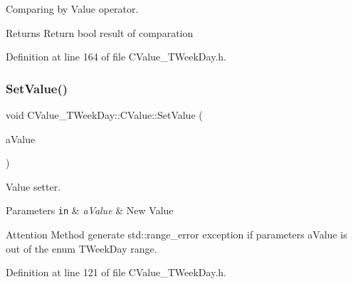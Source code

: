 Comparing by Value operator. 

\begin{DoxyReturn}{Returns}
Return {\ttfamily bool} result of comparation 
\end{DoxyReturn}


Definition at line 164 of file C\+Value\+\_\+\+T\+Week\+Day.\+h.

\mbox{\label{class_c_value___t_week_day_1_1_c_value_a3b2ee2ee229058d33770ec4787eed8a5}} 
\subsubsection{\texorpdfstring{Set\+Value()}{SetValue()}}
{\footnotesize\ttfamily void C\+Value\+\_\+\+T\+Week\+Day\+::\+C\+Value\+::\+Set\+Value (\begin{DoxyParamCaption}\item[{const \hyperlink{namespace_c_value___t_week_day_a6412f204509f223b789fb5f1a61a6124}{T\+Week\+Day}}]{a\+Value }\end{DoxyParamCaption})\hspace{0.3cm}{\ttfamily [inline]}}



Value setter. 


\begin{DoxyParams}[1]{Parameters}
\mbox{\tt in}  & {\em a\+Value} & New Value \\
\hline
\end{DoxyParams}
\begin{DoxyAttention}{Attention}
Method generate {\ttfamily std\+::range\+\_\+error} exception if parameters {\ttfamily a\+Value} is out of the {\ttfamily enum} T\+Week\+Day range. 
\end{DoxyAttention}


Definition at line 121 of file C\+Value\+\_\+\+T\+Week\+Day.\+h.

\mbox{\label{class_c_value___t_week_day_1_1_c_value_ae28f515b823fa787ebc70b9498a0cb49}} 
